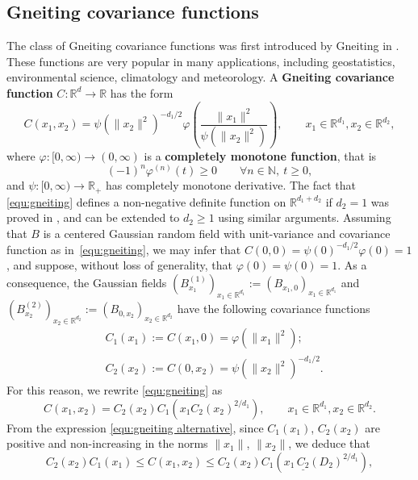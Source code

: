 \documentclass[12pt]{article}
\DeclareMathOperator{\1}{1}
\newcommand{\R}{\mathbb{R}}
\theoremstyle{plain}
\theoremstyle{definition}
\begin{document}
\subsection{Gneiting covariance functions}\label{subsec:gneiting}

The class of Gneiting covariance functions was first introduced by Gneiting in \cite{G02}. These functions are very popular in many applications, including geostatistics, environmental science, climatology and meteorology.  A \textbf{Gneiting covariance function} $C:\R^d\rightarrow \R$ has the form 
\begin{equation}\label{equ:gneiting}
    C(x_1,x_2)=\psi\left(\|x_2\|^2\right)^{-d_1/2}\varphi\left(\frac{\|x_1\|^2}{\psi\left(\|x_2\|^2\right)}\right),\quad \quad x_1\in\R^{d_1}, x_2\in\R^{d_2},
\end{equation}
where $\varphi:[0,\infty)\rightarrow (0,\infty)$ is a \textbf{completely monotone function}, that is
\[
(-1)^n\varphi^{(n)}(t)\ge0 \quad \quad \forall n\in\mathbb{N}, \ t\ge 0,
\]
and $\psi:[0,\infty)\rightarrow \R_+$ has
completely monotone derivative. The fact that \eqref{equ:gneiting} defines a non-negative definite function on $\R^{d_1+d_2}$ if $d_2=1$ was proved in \cite{G02}, and can be extended to $d_2\ge1$ using similar arguments. Assuming that $B$ is a centered Gaussian random field with unit-variance and covariance function as in~\eqref{equ:gneiting}, we may infer that $C(0,0)=\psi(0)^{-d_1/2}\varphi(0)=1$, and suppose, without loss of generality, that $\varphi(0)=\psi(0)=1$.
As a consequence, the Gaussian fields  $(B^{(1)}_{x_1})_{x_1\in\R^{d_1}}:=(B_{x_1,0})_{x_1\in\R^{d_1}}$ and $(B^{(2)}_{x_2})_{x_2\in\R^{d_2}}:=(B_{0,x_2})_{x_2\in\R^{d_2}}$ have the following covariance functions \begin{align}
    &\label{c1gneiting}C_1(x_1) :=  C(x_1,0) = \varphi\left(\|x_1\|^2\right); \\
    &\label{c2gneiting}C_2(x_2) := C(0,x_2) = \psi\left(\|x_2\|^2\right)^{-d_1/2}.
\end{align}
For this reason, we rewrite \eqref{equ:gneiting} as 
\begin{equation}
    \label{equ:gneiting alternative}C(x_1,x_2)=C_2(x_2)C_1\left(x_1C_2(x_2)^{2/d_1}\right), \quad \quad x_1\in\R^{d_1}, x_2\in\R^{d_2}.
\end{equation}
From the expression \eqref{equ:gneiting alternative}, since $C_1(x_1)$, $C_2(x_2)$ are positive and non-increasing in the norms $\|x_1\|$, $\|x_2\|$, we deduce that 
\begin{equation}
    \label{equ:gneitingproperties}
    C_2(x_2)C_1(x_1)\le C(x_1,x_2)\le C_2(x_2)C_1\left(x_1\,\underline{C_2}(D_2)^{2/d_1}\right),
\end{equation}
\end{document}
